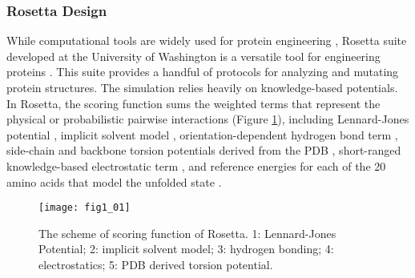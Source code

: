 \begin{refsection}
\subsubsection{Rosetta Design}

While computational tools are widely used for protein
engineering \cite{Rothlisberger2008,DiMaio2011a,Korkegian2005,
Leaver-Fay2013a,Leaver-Fay2011,Drew2013a,Kaufmann2010,Rohl2004}, Rosetta suite
developed at the University of Washington is a versatile tool for engineering
proteins \cite{Leaver-Fay2011}. This suite provides a handful of protocols for
analyzing and mutating protein structures.  The simulation relies heavily on
knowledge-based potentials. In Rosetta, the scoring function sums the weighted
terms that represent the physical or probabilistic pairwise interactions
\cite{Rohl2004} (Figure \ref{fig:rosetta-intro}), including Lennard-Jones
potential \cite{Clementi1999}, implicit solvent model \cite{Lazaridis1999},
orientation-dependent hydrogen bond term \cite{Kortemme2003}, side-chain and
backbone torsion potentials derived from the PDB \cite{Rohl2002}, short-ranged
knowledge-based electrostatic term \cite{Leaver-Fay2013a}, and reference
energies for each of the 20 amino acids that model the unfolded state
\cite{Leaver-Fay2013a}.
\begin{figure}[htbp] \centering \texttt{[image: fig1\_01]}
    \caption[The scheme of scoring function of Rosetta. 1: Lennard-Jones
    Potential; 2: implicit solvent model; 3: hydrogen bonding; 4:
electrostatics; 5: PDB drived torsion potential.]{The scheme of scoring
    function of Rosetta. 1: Lennard-Jones Potential; 2: implicit solvent model;
3: hydrogen bonding; 4: electrostatics; 5: PDB derived torsion potential.}
\label{fig:rosetta-intro}
\end{figure}


\end{refsection}
